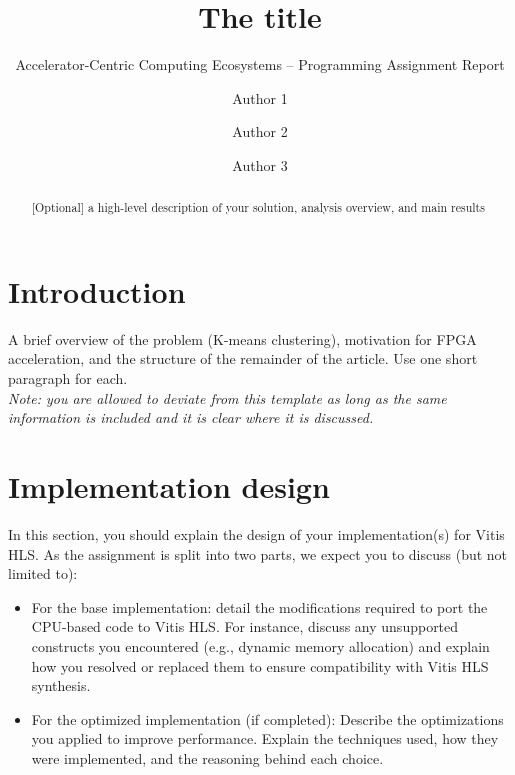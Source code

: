 \documentclass[sigconf, nonacm, review]{acmart}
\begin{document}
\title{The title}
\subtitle{Accelerator-Centric Computing Ecosystems -- Programming Assignment Report }



\author{Author 1}

\author{Author 2}
\author{Author 3}


\begin{abstract}
  [Optional]  a high-level description of your solution, analysis overview, and main results
\end{abstract}




\maketitle

\section{Introduction}
A brief overview of the problem (K-means clustering), motivation for FPGA acceleration, and the structure of the remainder of the article. Use one short paragraph for each.\\

\noindent
\textit{Note: you are allowed to deviate from this template as long as the same information is included and it is clear where it is discussed.}


\section{Implementation design}
In this section, you should explain the design of your implementation(s) for Vitis HLS. As the assignment is split into two parts, we expect you to discuss (but not limited to):
\begin{itemize} 
\item For the base implementation: detail the modifications required to port the CPU-based code to Vitis HLS. For instance, discuss any unsupported constructs you encountered (e.g., dynamic memory allocation) and explain how you resolved or replaced them to ensure compatibility with Vitis HLS synthesis.
\item For the optimized implementation (if completed): 
Describe the optimizations you applied to improve performance. Explain the techniques used, how they were implemented, and the reasoning behind each choice. 
\end{itemize}
\end{document}
